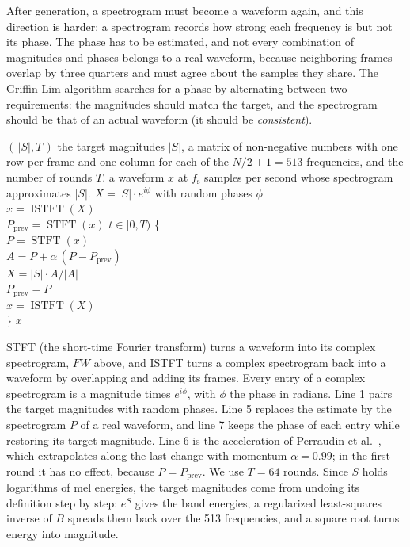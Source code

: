 After generation, a spectrogram must become a waveform again, and this
direction is harder: a spectrogram records how strong each frequency is but
not its phase. The phase has to be estimated, and not every combination of
magnitudes and phases belongs to a real waveform, because neighboring frames
overlap by three quarters and must agree about the samples they share. The
Griffin-Lim algorithm \cite{griffin1984signal} searches for a phase by
alternating between two requirements: the magnitudes should match the
target, and the spectrogram should be that of an actual waveform (it should be
\emph{consistent}).

\begin{procedure}{$(\,|S|, T\,)$}
{the target magnitudes $|S|$, a matrix of non-negative numbers with one row per
frame and one column for each of the $N/2 + 1 = 513$ frequencies, and the number
of rounds $T$.}
{a waveform $x$ at $f_\text{s}$ samples per second whose spectrogram
approximates $|S|$.}
\li $X = |S| \cdot e^{i\phi}$ with random phases $\phi$ \\
\li $x = \operatorname{ISTFT}(X)$ \\
\li $P_\text{prev} = \operatorname{STFT}(x)$ \groupend
\li {} $t \in [0, T)$ \{ \\
\li \> $P = \operatorname{STFT}(x)$  \\
\li \> $A = P + \alpha\,(P - P_\text{prev})$  \\
\li \> $X = |S| \cdot A / |A|$  \\
\li \> $P_\text{prev} = P$ \\
\li \> $x = \operatorname{ISTFT}(X)$ \\
\li \} \groupend
\li {} $x$
\end{procedure}

STFT (the short-time Fourier transform) turns a waveform into its complex
spectrogram, $FW$ above, and ISTFT turns a complex spectrogram back into a
waveform by overlapping and adding its frames. Every entry of a complex
spectrogram is a magnitude times $e^{i\phi}$, with $\phi$ the phase in radians.
Line 1 pairs the target magnitudes with random phases. Line 5 replaces the
estimate by the spectrogram $P$ of a real waveform, and line 7 keeps the phase
of each entry while restoring its target magnitude. Line 6 is the acceleration
of Perraudin et al.\ \cite{perraudin2013fast}, which extrapolates along the
last change with momentum $\alpha = 0.99$; in the first round it has no effect,
because $P = P_\text{prev}$. We use $T = 64$ rounds. Since $S$ holds
logarithms of mel energies, the target magnitudes come from undoing its
definition step by step: $e^{S}$ gives the band energies, a regularized
least-squares inverse of $B$ spreads them back over the 513 frequencies, and a
square root turns energy into magnitude.

